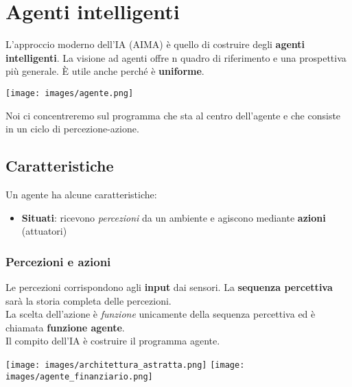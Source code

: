 \newpage
\section{Agenti intelligenti}
L'approccio moderno dell'IA (AIMA) è quello di costruire degli \textbf{agenti intelligenti}. La visione ad agenti offre n quadro di riferimento e una prospettiva più generale. È utile anche perché è \textbf{uniforme}.
\begin{center}
	\texttt{[image: images/agente.png]}
\end{center}
Noi ci concentreremo sul programma che sta al centro dell'agente e che consiste in un ciclo di percezione-azione.
\subsection{Caratteristiche}
Un agente ha alcune caratteristiche:
\begin{itemize}
	\item \textbf{Situati}: ricevono \emph{percezioni} da un ambiente e agiscono mediante \textbf{azioni} (attuatori)
	
\end{itemize}

\subsubsection{Percezioni e azioni}
Le percezioni corrispondono agli \textbf{input} dai sensori. La \textbf{sequenza percettiva} sarà la storia completa delle percezioni.\\
La scelta dell'azione è \emph{funzione} unicamente della sequenza percettiva ed è chiamata \textbf{funzione agente}.\\
Il compito dell'IA è costruire il programma agente.
\begin{center}
	\texttt{[image: images/architettura\_astratta.png]}
	\texttt{[image: images/agente\_finanziario.png]}
\end{center}

